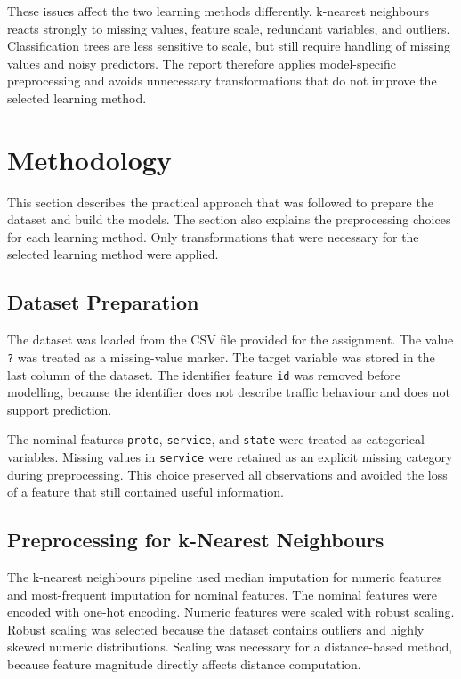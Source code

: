 \documentclass[conference,10pt]{IEEEtran}
\begin{document}
These issues affect the two learning methods differently. k-nearest neighbours reacts strongly to missing values, feature scale, redundant variables, and outliers. Classification trees are less sensitive to scale, but still require handling of missing values and noisy predictors. The report therefore applies model-specific preprocessing and avoids unnecessary transformations that do not improve the selected learning method.

\section{Methodology}
This section describes the practical approach that was followed to prepare the dataset and build the models. The section also explains the preprocessing choices for each learning method. Only transformations that were necessary for the selected learning method were applied.

\subsection{Dataset Preparation}
The dataset was loaded from the CSV file provided for the assignment. The value \texttt{?} was treated as a missing-value marker. The target variable was stored in the last column of the dataset. The identifier feature \texttt{id} was removed before modelling, because the identifier does not describe traffic behaviour and does not support prediction.

The nominal features \texttt{proto}, \texttt{service}, and \texttt{state} were treated as categorical variables. Missing values in \texttt{service} were retained as an explicit missing category during preprocessing. This choice preserved all observations and avoided the loss of a feature that still contained useful information.

\subsection{Preprocessing for k-Nearest Neighbours}
The k-nearest neighbours pipeline used median imputation for numeric features and most-frequent imputation for nominal features. The nominal features were encoded with one-hot encoding. Numeric features were scaled with robust scaling. Robust scaling was selected because the dataset contains outliers and highly skewed numeric distributions. Scaling was necessary for a distance-based method, because feature magnitude directly affects distance computation.
\end{document}
